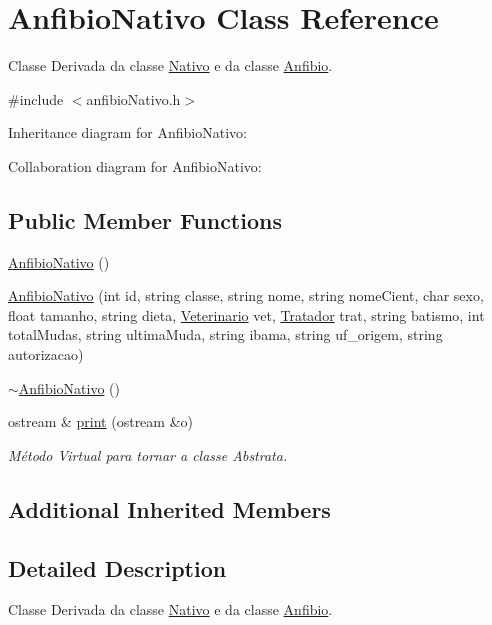 \hypertarget{classAnfibioNativo}{}\section{Anfibio\+Nativo Class Reference}
\label{classAnfibioNativo}


Classe Derivada da classe \hyperlink{classNativo}{Nativo} e da classe \hyperlink{classAnfibio}{Anfibio}.  




{\ttfamily \#include $<$anfibio\+Nativo.\+h$>$}



Inheritance diagram for Anfibio\+Nativo\+:


Collaboration diagram for Anfibio\+Nativo\+:
\subsection*{Public Member Functions}
\begin{DoxyCompactItemize}
\item 
\hyperlink{classAnfibioNativo_a469824d5a99c24f0e5867c3b7e33cc6d}{Anfibio\+Nativo} ()
\item 
\hyperlink{classAnfibioNativo_a5fd14fcd98571ba7dfbe07e1b59748ba}{Anfibio\+Nativo} (int id, string classe, string nome, string nome\+Cient, char sexo, float tamanho, string dieta, \hyperlink{classVeterinario}{Veterinario} vet, \hyperlink{classTratador}{Tratador} trat, string batismo, int total\+Mudas, string ultima\+Muda, string ibama, string uf\+\_\+origem, string autorizacao)
\item 
\hyperlink{classAnfibioNativo_a10ecde482410d669995fd852ba150d75}{$\sim$\+Anfibio\+Nativo} ()
\item 
ostream \& \hyperlink{classAnfibioNativo_a2db2ade56011851b6dab72d8598f52c9}{print} (ostream \&o)
\begin{DoxyCompactList}\small\item\em Método Virtual para tornar a classe Abstrata. \end{DoxyCompactList}\end{DoxyCompactItemize}
\subsection*{Additional Inherited Members}


\subsection{Detailed Description}
Classe Derivada da classe \hyperlink{classNativo}{Nativo} e da classe \hyperlink{classAnfibio}{Anfibio}. 

